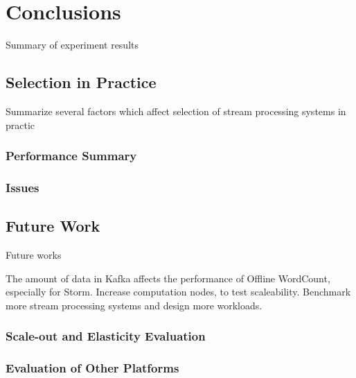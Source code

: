 \chapter{Conclusions}
Summary of experiment results 

\section{Selection in Practice}
Summarize several factors which affect selection of stream processing systems in practic

\subsection{Performance Summary}
\subsection{Issues }

\section{Future Work}
Future works

The amount of data in Kafka affects the performance of Offline WordCount, especially for Storm.
Increase computation nodes, to test scaleability. 
Benchmark more stream processing systems and design more workloads.

\subsection{Scale-out and Elasticity Evaluation}
\subsection{Evaluation of Other Platforms}

\clearpage